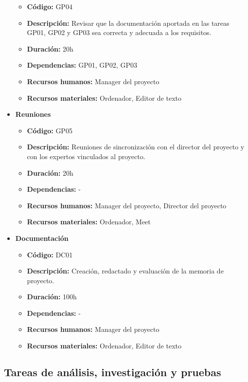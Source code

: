 \begin{itemize}
        \begin{itemize}
            \item \textbf{Código:} GP04
            \item \textbf{Descripción:} Revisar que la documentación aportada en las tareas GP01, GP02 y GP03 sea correcta y adecuada a los requisitos.
            \item \textbf{Duración:} 20h
            \item \textbf{Dependencias:} GP01, GP02, GP03
            \item \textbf{Recursos humanos:} Manager del proyecto
            \item \textbf{Recursos materiales:} Ordenador, Editor de texto
        \end{itemize}
    \item \textbf{Reuniones}
        \begin{itemize}
            \item \textbf{Código:} GP05
            \item \textbf{Descripción:} Reuniones de sincronización con el director del proyecto y con los expertos vinculados al proyecto.
            \item \textbf{Duración:} 20h
            \item \textbf{Dependencias:} - 
            \item \textbf{Recursos humanos:} Manager del proyecto, Director del proyecto
            \item \textbf{Recursos materiales:} Ordenador, Meet
        \end{itemize}
    \item \textbf{Documentación}
        \begin{itemize}
            \item \textbf{Código:} DC01
            \item \textbf{Descripción:} Creación, redactado y evaluación de la memoria de proyecto.
            \item \textbf{Duración:} 100h
            \item \textbf{Dependencias:} -
            \item \textbf{Recursos humanos:} Manager del proyecto
            \item \textbf{Recursos materiales:} Ordenador, Editor de texto
        \end{itemize}
\end{itemize}

\subsection{Tareas de análisis, investigación y pruebas}
\label{subsec:tareas_analisis}

